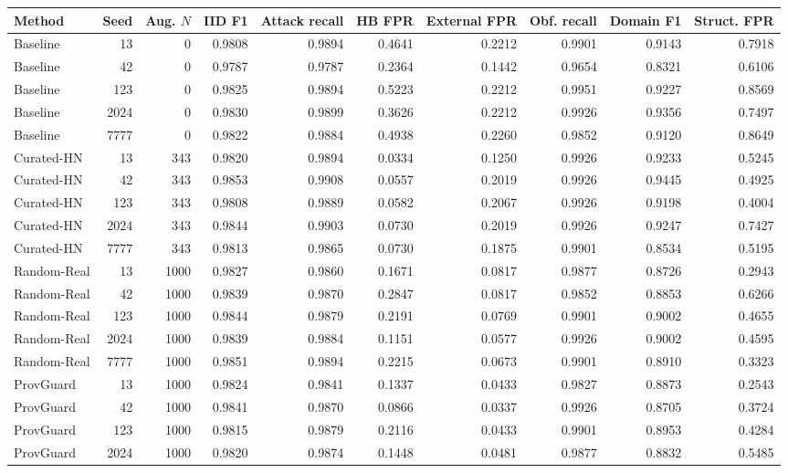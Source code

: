 \begin{tabular}{@{}lrrrrrrrrr@{}}
\toprule
Method & Seed & Aug. $N$ & IID F1 & Attack recall & HB FPR & External FPR & Obf. recall & Domain F1 & Struct. FPR \\
\midrule
Baseline & 13 & 0 & 0.9808 & 0.9894 & 0.4641 & 0.2212 & 0.9901 & 0.9143 & 0.7918 \\
Baseline & 42 & 0 & 0.9787 & 0.9787 & 0.2364 & 0.1442 & 0.9654 & 0.8321 & 0.6106 \\
Baseline & 123 & 0 & 0.9825 & 0.9894 & 0.5223 & 0.2212 & 0.9951 & 0.9227 & 0.8569 \\
Baseline & 2024 & 0 & 0.9830 & 0.9899 & 0.3626 & 0.2212 & 0.9926 & 0.9356 & 0.7497 \\
Baseline & 7777 & 0 & 0.9822 & 0.9884 & 0.4938 & 0.2260 & 0.9852 & 0.9120 & 0.8649 \\
Curated-HN & 13 & 343 & 0.9820 & 0.9894 & 0.0334 & 0.1250 & 0.9926 & 0.9233 & 0.5245 \\
Curated-HN & 42 & 343 & 0.9853 & 0.9908 & 0.0557 & 0.2019 & 0.9926 & 0.9445 & 0.4925 \\
Curated-HN & 123 & 343 & 0.9808 & 0.9889 & 0.0582 & 0.2067 & 0.9926 & 0.9198 & 0.4004 \\
Curated-HN & 2024 & 343 & 0.9844 & 0.9903 & 0.0730 & 0.2019 & 0.9926 & 0.9247 & 0.7427 \\
Curated-HN & 7777 & 343 & 0.9813 & 0.9865 & 0.0730 & 0.1875 & 0.9901 & 0.8534 & 0.5195 \\
Random-Real & 13 & 1000 & 0.9827 & 0.9860 & 0.1671 & 0.0817 & 0.9877 & 0.8726 & 0.2943 \\
Random-Real & 42 & 1000 & 0.9839 & 0.9870 & 0.2847 & 0.0817 & 0.9852 & 0.8853 & 0.6266 \\
Random-Real & 123 & 1000 & 0.9844 & 0.9879 & 0.2191 & 0.0769 & 0.9901 & 0.9002 & 0.4655 \\
Random-Real & 2024 & 1000 & 0.9839 & 0.9884 & 0.1151 & 0.0577 & 0.9926 & 0.9002 & 0.4595 \\
Random-Real & 7777 & 1000 & 0.9851 & 0.9894 & 0.2215 & 0.0673 & 0.9901 & 0.8910 & 0.3323 \\
ProvGuard & 13 & 1000 & 0.9824 & 0.9841 & 0.1337 & 0.0433 & 0.9827 & 0.8873 & 0.2543 \\
ProvGuard & 42 & 1000 & 0.9841 & 0.9870 & 0.0866 & 0.0337 & 0.9926 & 0.8705 & 0.3724 \\
ProvGuard & 123 & 1000 & 0.9815 & 0.9879 & 0.2116 & 0.0433 & 0.9901 & 0.8953 & 0.4284 \\
ProvGuard & 2024 & 1000 & 0.9820 & 0.9874 & 0.1448 & 0.0481 & 0.9877 & 0.8832 & 0.5485 \\

\end{tabular}
